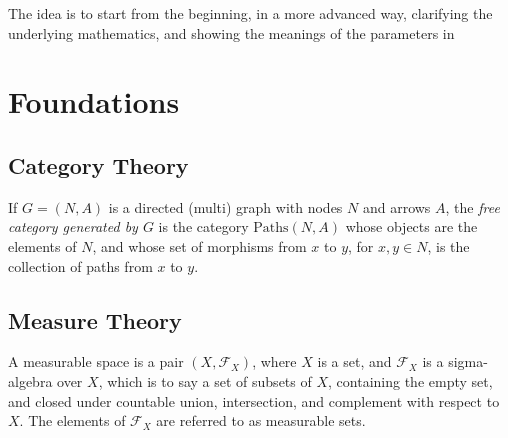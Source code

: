 \documentclass[twoside]{article} %
\theoremstyle{plain}
\theoremstyle{definition}
\begin{document}
%
%

    The idea is to start from the beginning, in a more advanced way, clarifying the underlying mathematics, and showing the meanings of the parameters in 
    
    \section{Foundations}
    
    
    \subsection{Category Theory}
    \begin{defn}
        If $G = (N, A)$ is a directed (multi) graph with nodes $N$ and arrows $A$, the \emph{free category generated by $G$} is the category $\mathrm{Paths}(N,A)$ whose objects are the elements of $N$, and whose set of morphisms from $x$ to $y$, for $x,y \in N$, is the collection of paths from $x$ to $y$.
    \end{defn}
    
    \subsection{Measure Theory}
    
    \begin{defn}
        A measurable space is a pair $(X, \mathcal F_X)$, where $X$ is a set, and   $\mathcal F_X$ is a sigma-algebra over $X$, which is to say a set of subsets of $X$, containing the empty set, and closed under countable union, intersection, and complement with respect to $X$.
        The elements of $\mathcal F_X$ are referred to as measurable sets.
    \end{defn}
    
\end{document}
